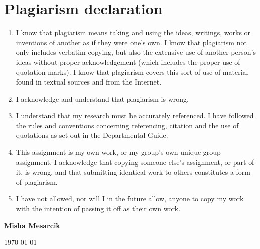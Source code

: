 	\section*{Plagiarism declaration} %
	\begin{enumerate}
		\item I know that plagiarism means taking and using the ideas, writings, works
		or inventions of another as if they were one’s own. I know that plagiarism
		not only includes verbatim copying, but also the extensive use of another
		person’s ideas without proper acknowledgement (which includes the
		proper use of quotation marks). I know that plagiarism covers this sort of
		use of material found in textual sources and from the Internet. 
		\item I acknowledge and understand that plagiarism is wrong. 
		\item I understand that my research must be accurately referenced. I have
		followed the rules and conventions concerning referencing, citation and the
		use of quotations as set out in the Departmental Guide. 
		\item This assignment is my own work, or my group’s own unique group
		assignment. I acknowledge that copying someone else’s assignment, or part
		of it, is wrong, and that submitting identical work to others constitutes a
		form of plagiarism. 
		\item I have not allowed, nor will I in the future allow, anyone to copy my work
		with the intention of passing it off as their own work. 
	\end{enumerate}
	
	\begin{bottompar}


		\textbf{Misha Mesarcik}

		\today
		
		
	\end{bottompar}

